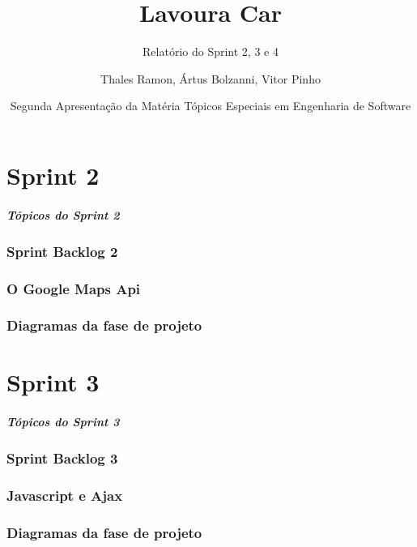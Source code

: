 \documentclass[12pt,a4paper]{beamer}
\author{Thales Ramon, Ártus Bolzanni, Vitor Pinho}
\title{Lavoura Car}
\subtitle{Relatório do Sprint 2, 3 e  4}
\date[UNEB-SI 2010.2]{Segunda Apresentação da Matéria Tópicos Especiais em Engenharia de Software}
\institute[UNEB]{Universidade Estadual da Bahia}
\begin{document}
	\begin{frame}
		\titlepage
	\end{frame}
	
	\part{Sprint 2}
		\begin{frame}
			\frametitle{Tópicos do Sprint 2}
			\tableofcontents[pausesections]
		\end{frame}
		
		\section{Sprint Backlog 2}
		\section{O Google Maps Api}
		\section{Diagramas da fase de projeto}
	\part{Sprint 3}
	
		\begin{frame}
			\frametitle{Tópicos do Sprint 3}
			\tableofcontents[pausesections]
		\end{frame}	
	
		\section{Sprint Backlog 3}
		\section{Javascript e Ajax}
		\section{Diagramas da fase de projeto}
\end{document}
